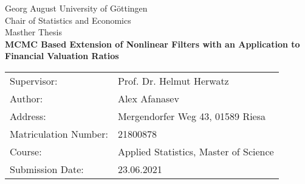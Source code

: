\begin{titlepage}
	\begin{center}
	\vspace*{4cm}
	{\LARGE Georg August University of Göttingen}\\
	\vskip 1.5cm
	{\large Chair of Statistics and Economics}\\
	\vskip 0.5cm
	{\large Masther Thesis}\\
	\vskip 2.0cm
	{\LARGE\textbf{MCMC Based Extension of Nonlinear Filters with an Application to Financial Valuation Ratios}}\\
	\end{center}
\vfill
\vfill
\begin{tabular}{ll}
	Supervisor: & Prof. Dr. Helmut Herwatz \\
	Author: & Alex Afanasev \\
	Address: & Mergendorfer Weg 43, 01589 Riesa \\
	Matriculation Number: & 21800878 \\
	Course: & Applied Statistics, Master of Science \\
	Submission Date: & 23.06.2021 \\
\end{tabular}
\end{titlepage}
